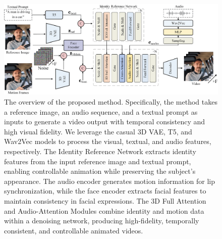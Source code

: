 \begin{figure}[t!]
    \centering

    \begin{minipage}[b]{0.65\textwidth} %
        \centering
        \includegraphics[width=\linewidth]{figs/Pipeline_comp.png} %
        \caption{The overview of the proposed method. Specifically, the method takes a reference image, an audio sequence, and a textual prompt as inputs to generate a video output with temporal consistency and high visual fidelity. We leverage the casual 3D VAE, T5, and Wav2Vec models to process the visual, textual, and audio features, respectively. The Identity Reference Network extracts identity features from the input reference image and textual prompt, enabling controllable animation while preserving the subject's appearance. The audio encoder generates motion information for lip synchronization, while the face encoder extracts facial features to maintain consistency in facial expressions. The 3D Full Attention and Audio-Attention Modules combine identity and motion data within a denoising network, producing high-fidelity, temporally consistent, and controllable animated videos.}
        \label{fig:architecture}


\end{minipage}
\end{figure}
